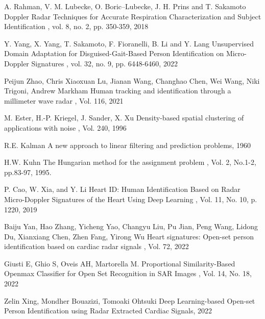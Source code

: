 \begin{bib}[100]
  A. Rahman, V. M. Lubecke, O. Boric–Lubecke, J. H. Prins and T. Sakamoto
  \newblock Doppler Radar Techniques for Accurate Respiration Characterization and Subject Identification
  , vol. 8, no. 2, pp. 350-359, 2018


  Y. Yang, X. Yang, T. Sakamoto, F. Fioranelli, B. Li and Y. Lang
  \newblock Unsupervised Domain Adaptation for Disguised-Gait-Based Person Identification on Micro-Doppler Signatures
  , vol. 32, no. 9, pp. 6448-6460, 2022

  Peijun Zhao, Chris Xiaoxuan Lu, Jianan Wang, Changhao Chen, Wei Wang, Niki Trigoni, Andrew Markham
  \newblock Human tracking and identification through a millimeter wave radar
  , Vol. 116, 2021

  M. Ester, H.-P. Kriegel, J. Sander, X. Xu
  \newblock Density-based spatial clustering of applications with noise
  , Vol. 240, 1996

  R.E. Kalman
  \newblock A new approach to linear filtering and prediction problems, 1960

  H.W. Kuhn
  \newblock The Hungarian method for the assignment problem
  , Vol. 2, No.1-2, pp.83-97, 1995.

  P. Cao, W. Xia, and Y. Li
  \newblock Heart ID: Human Identification Based on Radar Micro-Doppler Signatures of the Heart Using Deep Learning
  , Vol. 11, No. 10, p. 1220, 2019

Baiju Yan, Hao Zhang, Yicheng Yao, Changyu Liu, Pu Jian, Peng Wang, Lidong Du, Xianxiang Chen, Zhen Fang, Yirong Wu
\newblock Heart signatures: Open-set person identification based on cardiac radar signals
, Vol. 72, 2022

Giusti E, Ghio S, Oveis AH, Martorella M. 
\newblock Proportional Similarity-Based Openmax Classifier for Open Set Recognition in SAR Images
, Vol. 14, No. 18, 2022

  Zelin Xing, Mondher Bouazizi, Tomoaki Ohtsuki
  \newblock Deep Learning-based Open-set Person Identification using Radar Extracted Cardiac Signals, 2022
	

\end{bib}
